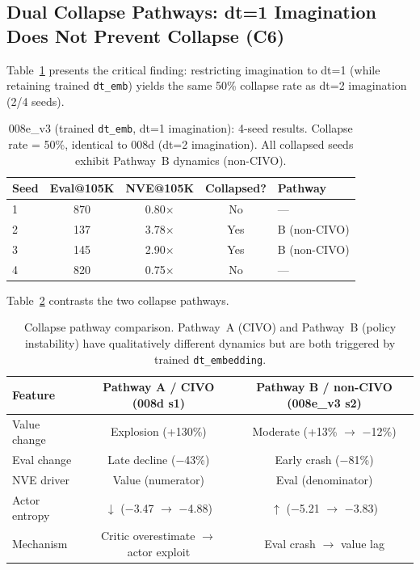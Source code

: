 \documentclass[10pt,letterpaper]{article}
\begin{document}
\subsection{Dual Collapse Pathways: dt=1 Imagination Does Not Prevent Collapse (C6)}
\label{sec:c6}

Table~\ref{tab:c6_pathways} presents the critical finding: restricting imagination to dt=1 (while retaining trained \texttt{dt\_emb}) yields the same 50\% collapse rate as dt=2 imagination (2/4 seeds).

\begin{table}[h]
\centering
\caption{008e\_v3 (trained \texttt{dt\_emb}, dt=1 imagination): 4-seed results. Collapse rate = 50\%, identical to 008d (dt=2 imagination). All collapsed seeds exhibit Pathway~B dynamics (non-CIVO).}
\label{tab:c6_pathways}
\begin{tabular}{lcccl}
\toprule
Seed & Eval@105K & NVE@105K & Collapsed? & Pathway \\
\midrule
1 & 870 & 0.80$\times$ & No & --- \\
2 & 137 & 3.78$\times$ & Yes & B (non-CIVO) \\
3 & 145 & 2.90$\times$ & Yes & B (non-CIVO) \\
4 & 820 & 0.75$\times$ & No & --- \\
\bottomrule
\end{tabular}
\end{table}

Table~\ref{tab:pathway_comparison} contrasts the two collapse pathways.

\begin{table}[h]
\centering
\caption{Collapse pathway comparison. Pathway~A (CIVO) and Pathway~B (policy instability) have qualitatively different dynamics but are both triggered by trained \texttt{dt\_embedding}.}
\label{tab:pathway_comparison}
\begin{tabular}{lcc}
\toprule
Feature & Pathway A / CIVO (008d s1) & Pathway B / non-CIVO (008e\_v3 s2) \\
\midrule
Value change & Explosion (+130\%) & Moderate (+13\% $\rightarrow$ $-$12\%) \\
Eval change & Late decline ($-$43\%) & Early crash ($-$81\%) \\
NVE driver & Value (numerator) & Eval (denominator) \\
Actor entropy & $\downarrow$ ($-$3.47 $\rightarrow$ $-$4.88) & $\uparrow$ ($-$5.21 $\rightarrow$ $-$3.83) \\
Mechanism & Critic overestimate $\rightarrow$ actor exploit & Eval crash $\rightarrow$ value lag \\
\bottomrule
\end{tabular}
\end{table}
\end{document}
